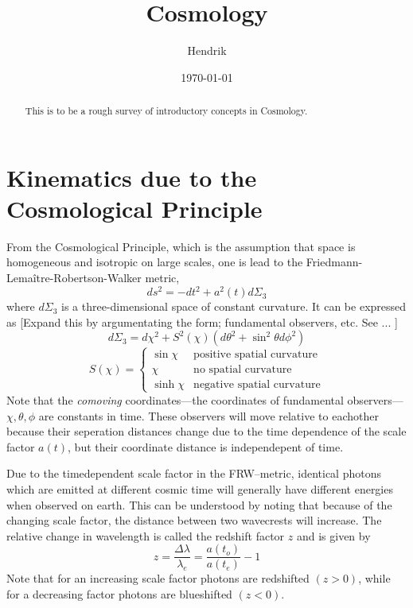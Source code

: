 \documentclass[10pt]{article}
\title{Cosmology}
\date{\today}
\author{Hendrik}
\begin{document}
\maketitle

\begin{abstract}
	This is to be a rough survey of introductory concepts in 
	Cosmology.  \end{abstract}

\section{Kinematics due to the Cosmological Principle}

From the Cosmological Principle, which is the assumption that 
space is homogeneous and isotropic on large scales, one is lead 
to the Friedmann-Lema\^itre-Robertson-Walker metric,
%
\begin{equation}
	ds^2 = -dt^2 + a^2(t) d\Sigma_3
\end{equation}
%
where $d\Sigma_3$ is a three-dimensional space of constant 
curvature. It can be expressed as
[Expand this by argumentating the form; fundamental observers, 
etc. See ... ]
%
\begin{equation}
	d\Sigma_3 = d\chi^2 + S^2(\chi)(d\theta^2 + \sin^2 \theta 
	d\phi^2)
\end{equation}
%
\begin{equation}
	S(\chi) =
	\begin{cases}
		\sin\chi & \text{positive spatial curvature}\\
		\chi & \text{no spatial curvature}\\
		\sinh\chi & \text{negative spatial curvature}
	\end{cases}
\end{equation}
Note that the \emph{comoving} coordinates---the coordinates of 
fundamental observers---$\chi,\theta,\phi$ are constants in time. 
These observers will move relative to eachother because their 
seperation distances change due to the time dependence of the 
scale factor $a(t)$, but their coordinate distance is 
independepent of time.

Due to the timedependent scale factor in the FRW--metric, 
identical photons which are emitted at different cosmic time will 
generally have different energies when observed on earth. This 
can be understood by noting that because of the changing scale 
factor, the distance between two wavecrests will increase. The 
relative change in wavelength is called the redshift factor $z$ 
and is given by
%
\begin{equation}
	z = \frac{\Delta \lambda}{\lambda_e} = \frac{a(t_o)}{a(t_e)}-1
\end{equation}
Note that for an increasing scale factor photons are redshifted 
$(z>0)$, while for a decreasing factor photons are blueshifted 
$(z<0)$.
\end{document}
